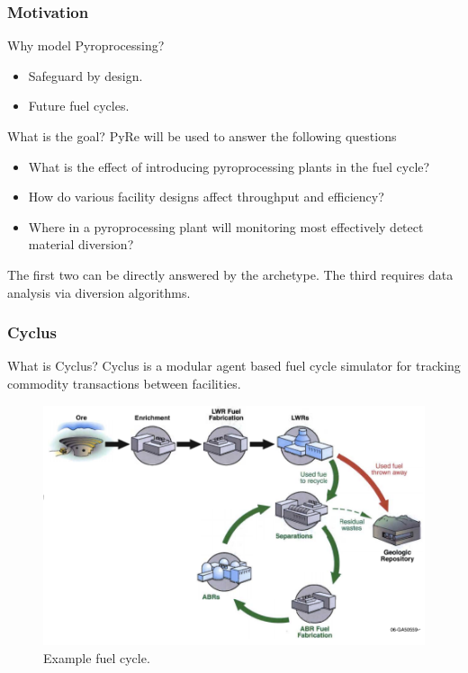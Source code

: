 \begin{frame}
  \frametitle{Motivation}
  \begin{block}{Why model Pyroprocessing?}
  	\begin{itemize}
  		\item Safeguard by design.
  		\item Future fuel cycles.
  	\end{itemize}
  \end{block}
 \begin{block}{What is the goal?}
 	PyRe will be used to answer the following questions
 	\begin{itemize}
 		\item What is the effect of introducing pyroprocessing plants in the fuel cycle?
 		\item How do various facility designs affect throughput and efficiency?
 		\item Where in a pyroprocessing plant will monitoring most 
 		effectively detect material diversion?
 	\end{itemize}
\end{block}
The first two can be directly answered by the archetype. The third requires data analysis via
diversion algorithms.	
\end{frame}

\begin{frame}
\frametitle{Cyclus}
\begin{block}{What is Cyclus?}
	Cyclus is a modular agent based fuel cycle simulator for tracking commodity transactions
	between facilities.
\end{block}
\begin{figure}
	\centering
	\includegraphics[width=0.7\linewidth]{lanl-fuel-cycle.png}
	\caption{Example fuel cycle\cite{zhou_model_2011}.}
\end{figure}
\end{frame}

